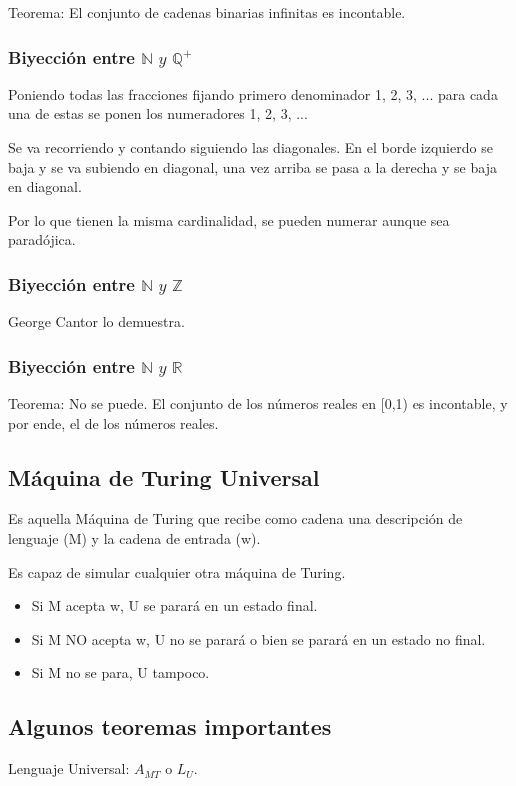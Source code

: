 Teorema: El conjunto de cadenas binarias infinitas es incontable.

\subsubsection{Biyección entre $\mathbb{N}\textit{ y }\mathbb{Q}^+$}
Poniendo todas las fracciones fijando primero denominador 1, 2, 3, ... para cada una de estas se ponen los numeradores 1, 2, 3, ... 

Se va recorriendo y contando siguiendo las diagonales. En el borde izquierdo se baja y se va subiendo en diagonal, una vez arriba se pasa a la derecha y se baja en diagonal.

Por lo que tienen la misma cardinalidad, se pueden numerar aunque sea paradójica.

\subsubsection{Biyección entre $\mathbb{N}\textit{ y }\mathbb{Z}$}
George Cantor lo demuestra.

\subsubsection{Biyección entre $\mathbb{N}\textit{ y }\mathbb{R}$}
Teorema: No se puede. El conjunto de los números reales en [0,1) es incontable, y por ende, el de los números reales.

\subsection{Máquina de Turing Universal}
Es aquella Máquina de Turing que recibe como cadena una descripción de lenguaje (M) y la cadena de entrada (w).

Es capaz de simular cualquier otra máquina de Turing.
\begin{itemize}
    \item Si M acepta w, U se parará en un estado final.
    \item Si M NO acepta w, U no se parará o bien se parará en un estado no final.
    \item Si M no se para, U tampoco.
\end{itemize}

\subsection{Algunos teoremas importantes}
Lenguaje Universal: $A_{MT}$ o $L_U$.

